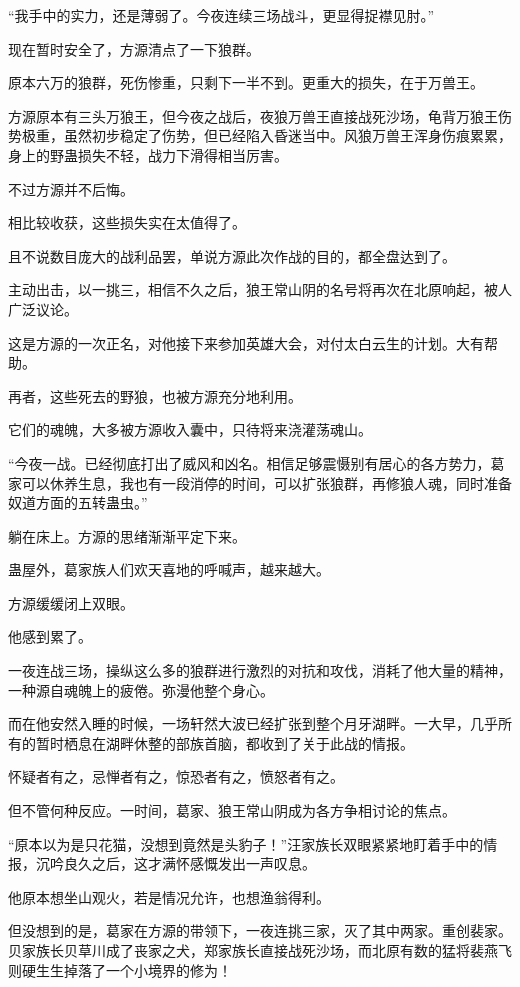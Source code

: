 \begin{this_body}
“我手中的实力，还是薄弱了。今夜连续三场战斗，更显得捉襟见肘。”

现在暂时安全了，方源清点了一下狼群。

原本六万的狼群，死伤惨重，只剩下一半不到。更重大的损失，在于万兽王。

方源原本有三头万狼王，但今夜之战后，夜狼万兽王直接战死沙场，龟背万狼王伤势极重，虽然初步稳定了伤势，但已经陷入昏迷当中。风狼万兽王浑身伤痕累累，身上的野蛊损失不轻，战力下滑得相当厉害。

不过方源并不后悔。

相比较收获，这些损失实在太值得了。

且不说数目庞大的战利品罢，单说方源此次作战的目的，都全盘达到了。

主动出击，以一挑三，相信不久之后，狼王常山阴的名号将再次在北原响起，被人广泛议论。

这是方源的一次正名，对他接下来参加英雄大会，对付太白云生的计划。大有帮助。

再者，这些死去的野狼，也被方源充分地利用。

它们的魂魄，大多被方源收入囊中，只待将来浇灌荡魂山。

“今夜一战。已经彻底打出了威风和凶名。相信足够震慑别有居心的各方势力，葛家可以休养生息，我也有一段消停的时间，可以扩张狼群，再修狼人魂，同时准备奴道方面的五转蛊虫。”

躺在床上。方源的思绪渐渐平定下来。

蛊屋外，葛家族人们欢天喜地的呼喊声，越来越大。

方源缓缓闭上双眼。

他感到累了。

一夜连战三场，操纵这么多的狼群进行激烈的对抗和攻伐，消耗了他大量的精神，一种源自魂魄上的疲倦。弥漫他整个身心。

而在他安然入睡的时候，一场轩然大波已经扩张到整个月牙湖畔。一大早，几乎所有的暂时栖息在湖畔休整的部族首脑，都收到了关于此战的情报。

怀疑者有之，忌惮者有之，惊恐者有之，愤怒者有之。

但不管何种反应。一时间，葛家、狼王常山阴成为各方争相讨论的焦点。

“原本以为是只花猫，没想到竟然是头豹子！”汪家族长双眼紧紧地盯着手中的情报，沉吟良久之后，这才满怀感慨发出一声叹息。

他原本想坐山观火，若是情况允许，也想渔翁得利。

但没想到的是，葛家在方源的带领下，一夜连挑三家，灭了其中两家。重创裴家。贝家族长贝草川成了丧家之犬，郑家族长直接战死沙场，而北原有数的猛将裴燕飞则硬生生掉落了一个小境界的修为！


\end{this_body}
